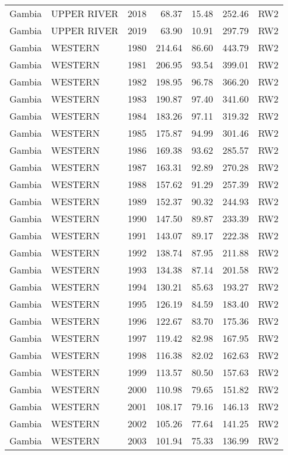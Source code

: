 \begin{longtable}{lllrrrl}
  Gambia & UPPER RIVER & 2018 & 68.37 & 15.48 & 252.46 & RW2 \\ 
  Gambia & UPPER RIVER & 2019 & 63.90 & 10.91 & 297.79 & RW2 \\ 
  Gambia & WESTERN & 1980 & 214.64 & 86.60 & 443.79 & RW2 \\ 
  Gambia & WESTERN & 1981 & 206.95 & 93.54 & 399.01 & RW2 \\ 
  Gambia & WESTERN & 1982 & 198.95 & 96.78 & 366.20 & RW2 \\ 
  Gambia & WESTERN & 1983 & 190.87 & 97.40 & 341.60 & RW2 \\ 
  Gambia & WESTERN & 1984 & 183.26 & 97.11 & 319.32 & RW2 \\ 
  Gambia & WESTERN & 1985 & 175.87 & 94.99 & 301.46 & RW2 \\ 
  Gambia & WESTERN & 1986 & 169.38 & 93.62 & 285.57 & RW2 \\ 
  Gambia & WESTERN & 1987 & 163.31 & 92.89 & 270.28 & RW2 \\ 
  Gambia & WESTERN & 1988 & 157.62 & 91.29 & 257.39 & RW2 \\ 
  Gambia & WESTERN & 1989 & 152.37 & 90.32 & 244.93 & RW2 \\ 
  Gambia & WESTERN & 1990 & 147.50 & 89.87 & 233.39 & RW2 \\ 
  Gambia & WESTERN & 1991 & 143.07 & 89.17 & 222.38 & RW2 \\ 
  Gambia & WESTERN & 1992 & 138.74 & 87.95 & 211.88 & RW2 \\ 
  Gambia & WESTERN & 1993 & 134.38 & 87.14 & 201.58 & RW2 \\ 
  Gambia & WESTERN & 1994 & 130.21 & 85.63 & 193.27 & RW2 \\ 
  Gambia & WESTERN & 1995 & 126.19 & 84.59 & 183.40 & RW2 \\ 
  Gambia & WESTERN & 1996 & 122.67 & 83.70 & 175.36 & RW2 \\ 
  Gambia & WESTERN & 1997 & 119.42 & 82.98 & 167.95 & RW2 \\ 
  Gambia & WESTERN & 1998 & 116.38 & 82.02 & 162.63 & RW2 \\ 
  Gambia & WESTERN & 1999 & 113.57 & 80.50 & 157.63 & RW2 \\ 
  Gambia & WESTERN & 2000 & 110.98 & 79.65 & 151.82 & RW2 \\ 
  Gambia & WESTERN & 2001 & 108.17 & 79.16 & 146.13 & RW2 \\ 
  Gambia & WESTERN & 2002 & 105.26 & 77.64 & 141.25 & RW2 \\ 
  Gambia & WESTERN & 2003 & 101.94 & 75.33 & 136.99 & RW2 \\ 

\end{longtable}
